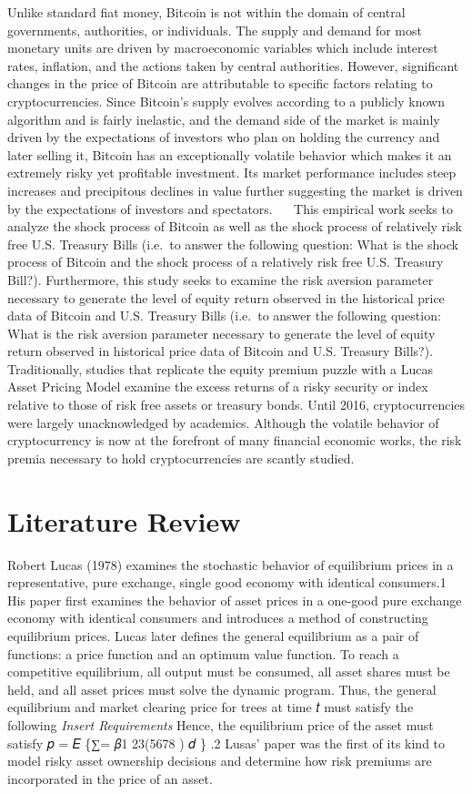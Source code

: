 \documentclass[]{article}
\begin{document}
Unlike standard fiat money, Bitcoin is not within the domain of central
governments, authorities, or individuals. The supply and demand for most
monetary units are driven by macroeconomic variables which include
interest rates, inflation, and the actions taken by central authorities.
However, significant changes in the price of Bitcoin are attributable to
specific factors relating to cryptocurrencies. Since Bitcoin's supply
evolves according to a publicly known algorithm and is fairly inelastic,
and the demand side of the market is mainly driven by the expectations
of investors who plan on holding the currency and later selling it,
Bitcoin has an exceptionally volatile behavior which makes it an
extremely risky yet profitable investment. Its market performance
includes steep increases and precipitous declines in value further
suggesting the market is driven by the expectations of investors and
spectators.   This empirical work seeks to analyze the shock process of
Bitcoin as well as the shock process of relatively risk free U.S.
Treasury Bills (i.e.~to answer the following question: What is the shock
process of Bitcoin and the shock process of a relatively risk free U.S.
Treasury Bill?). Furthermore, this study seeks to examine the risk
aversion parameter necessary to generate the level of equity return
observed in the historical price data of Bitcoin and U.S. Treasury Bills
(i.e.~to answer the following question: What is the risk aversion
parameter necessary to generate the level of equity return observed in
historical price data of Bitcoin and U.S. Treasury Bills?).
Traditionally, studies that replicate the equity premium puzzle with a
Lucas Asset Pricing Model examine the excess returns of a risky security
or index relative to those of risk free assets or treasury bonds. Until
2016, cryptocurrencies were largely unacknowledged by academics.
Although the volatile behavior of cryptocurrency is now at the forefront
of many financial economic works, the risk premia necessary to hold
cryptocurrencies are scantly studied.

\section{Literature Review}\label{literature-review}

Robert Lucas (1978) examines the stochastic behavior of equilibrium
prices in a representative, pure exchange, single good economy with
identical consumers.1 His paper first examines the behavior of asset
prices in a one-good pure exchange economy with identical consumers and
introduces a method of constructing equilibrium prices. Lucas later
defines the general equilibrium as a pair of functions: a price function
and an optimum value function. To reach a competitive equilibrium, all
output must be consumed, all asset shares must be held, and all asset
prices must solve the dynamic program. Thus, the general equilibrium and
market clearing price for trees at time 𝑡 must satisfy the following
\emph{Insert Requirements} Hence, the equilibrium price of the asset
must satisfy 𝑝 = 𝐸 \{∑= 𝛽1 23(5678 ) 𝑑 \} .2 Lusas' paper was the first
of its kind to model risky asset ownership decisions and determine how
risk premiums are incorporated in the price of an asset.
\end{document}
